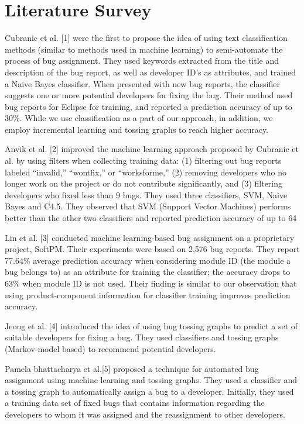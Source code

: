 
\chapter{Literature Survey} %

Cubranic et al. [1] were the first to propose the idea of using text classification methods (similar to methods used in machine learning) to semi-automate
the process of bug assignment. They used keywords extracted from the title
and description of the bug report, as well as developer ID’s as attributes, and
trained a Naive Bayes classifier. When presented with new bug reports, the
classifier suggests one or more potential developers for fixing the bug. Their
method used bug reports for Eclipse for training, and reported a prediction accuracy of up to 30\%. While we use classification as a part of our approach, in addition, we employ incremental learning and tossing graphs to reach higher accuracy.

Anvik et al. [2] improved the machine learning approach proposed by Cubranic et al. by using filters when collecting training data: (1) filtering out bug reports
labeled “invalid,” “wontfix,” or “worksforme,” (2) removing developers who no longer work on the project or do not contribute significantly, and (3) filtering developers who fixed less than 9 bugs. They used three classifiers, SVM, Naive Bayes and C4.5. They observed that SVM (Support Vector Machines) performs better than the other two classifiers and reported prediction accuracy of up to 64%

Lin et al. [3] conducted machine learning-based bug assignment on a proprietary project, SoftPM. Their experiments were based on 2,576 bug reports. They report 77.64\% average prediction accuracy when considering module ID (the module a bug belongs to) as an attribute for training the classifier; the accuracy drops to 63\% when module ID is not used. Their finding is similar to our observation that using product-component information for classifier training improves prediction accuracy.

Jeong et al. [4] introduced the idea of using bug tossing graphs to predict
a set of suitable developers for fixing a bug. They used classifiers and tossing
graphs (Markov-model based) to recommend potential developers.

Pamela bhattacharya et al.[5] proposed a technique for automated bug assignment using machine learning and tossing graphs. They used a classifier and a tossing graph to automatically assign a bug to a developer. Initially, they used a training data set of fixed bugs that contains information regarding the developers to whom it was assigned and the reassignment to other developers.



 




